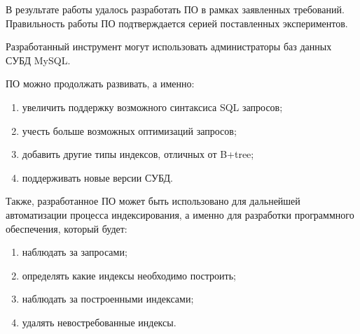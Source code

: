 \Conclusion

В результате работы удалось разработать ПО в рамках заявленных требований. Правильность работы ПО подтверждается серией поставленных экспериментов. 

Разработанный инструмент могут использовать администраторы баз данных СУБД MySQL. 

ПО можно продолжать развивать, а именно:
\begin{enumerate}
\item увеличить поддержку возможного синтаксиса SQL запросов;
\item учесть больше возможных оптимизаций запросов;
\item добавить другие типы индексов, отличных от B+tree;
\item поддерживать новые версии СУБД.
\end{enumerate}

Также, разработанное ПО может быть использовано для дальнейшей автоматизации процесса индексирования, а именно для разработки программного обеспечения, который будет:
\begin{enumerate}
\item наблюдать за запросами;
\item определять какие индексы необходимо построить;
\item наблюдать за построенными индексами;
\item удалять невостребованные индексы.
\end{enumerate}